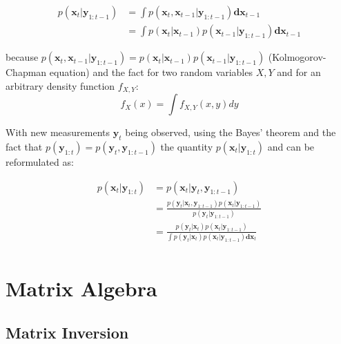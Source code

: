 \documentclass[
]{article}
\begin{document}
\begin{equation*} 
    \begin{aligned}
        p(\textbf{x}_{t}| \textbf{y}_{1:t-1}) &= \int p(\textbf{x}_{t}, \textbf{x}_{t-1}| \textbf{y}_{1:t-1}) \textbf{dx}_{t-1} \\
                                              &= \int p(\textbf{x}_{t}|\textbf{x}_{t-1}) p(\textbf{x}_{t-1} |\textbf{y}_{1:t-1}) \textbf{dx}_{t-1}
    \end{aligned}
\end{equation*}

because
\(p(\textbf{x}_{t}, \textbf{x}_{t-1}|\textbf{y}_{1:t-1}) = p(\textbf{x}_{t}|\textbf{x}_{t-1}) p(\textbf{x}_{t-1} |\textbf{y}_{1:t-1})\)
(Kolmogorov-Chapman equation) and the fact for two random variables
\(X,Y\) and for an arbitrary density function \(f_{X,Y}\):
\begin{equation*}
    f_X(x) = \int f_{X,Y}(x,y) dy
\end{equation*}

With new measurements \(\textbf{y}_t\) being observed, using the Bayes'
theorem and the fact that
\(p(\textbf{y}_{1:t}) = p(\textbf{y}_t, \textbf{y}_{1:t-1})\) the
quantity \(p(\textbf{x}_t|\textbf{y}_{1:t})\) and can be reformulated
as:

\begin{equation*} 
    \begin{aligned}
        p(\textbf{x}_t|\textbf{y}_{1:t}) &=  p(\textbf{x}_t|\textbf{y}_{t}, \textbf{y}_{1:t-1}) \\
                                         &=  \frac{p(\textbf{y}_{t}|\textbf{x}_t, \textbf{y}_{1:t-1}) p(\textbf{x}_t| \textbf{y}_{1:t-1}) }{p(\textbf{y}_{t}|\textbf{y}_{1:t-1})} \\
                                         &= \frac{p(\textbf{y}_{t}|\textbf{x}_t) p(\textbf{x}_t| \textbf{y}_{1:t-1}) }{\int p(\textbf{y}_{t}|\textbf{x}_{t})p(\textbf{x}_t
                                         |\textbf{y}_{1:t-1}) \textbf{dx}_t} \\
    \end{aligned}
\end{equation*}

\hypertarget{matrix-algebra}{%
\section{Matrix Algebra}\label{matrix-algebra}}

\hypertarget{matrix-inversion}{%
\subsection{Matrix Inversion}\label{matrix-inversion}}
\end{document}
